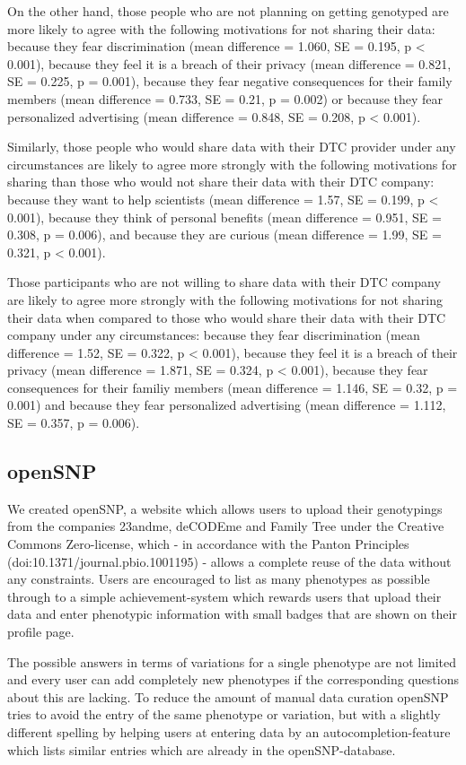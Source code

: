 \documentclass[10pt]{article}
\begin{document}
On the other hand, those people who are not planning on getting genotyped are more likely to agree with the following motivations for not sharing their data: because they fear discrimination (mean difference = 1.060, SE = 0.195, p < 0.001), because they feel it is a breach of their privacy (mean difference = 0.821, SE = 0.225, p = 0.001), because they fear negative consequences for their family members (mean difference = 0.733, SE = 0.21, p = 0.002) or because they fear personalized advertising (mean difference = 0.848, SE = 0.208, p < 0.001).

Similarly, those people who would share data with their DTC provider under any circumstances are likely to agree more strongly with the following motivations for sharing than those who would not share their data with their DTC company: because they want to help scientists (mean difference = 1.57, SE = 0.199, p < 0.001), because they think of personal benefits (mean difference = 0.951, SE = 0.308, p = 0.006), and because they are curious (mean difference = 1.99, SE = 0.321, p < 0.001). 

Those participants who are not willing to share data with their DTC company are likely to agree more strongly with the following motivations for not sharing their data when compared to those who would share their data with their DTC company under any circumstances: because they fear discrimination (mean difference = 1.52, SE = 0.322, p < 0.001), because they feel it is a breach of their privacy (mean difference = 1.871, SE = 0.324, p < 0.001), because they fear consequences for their familiy members (mean difference = 1.146, SE = 0.32, p = 0.001) and because they fear personalized advertising (mean difference =  1.112, SE = 0.357, p = 0.006). 

\subsection*{openSNP}
We created openSNP, a website which allows users to upload their genotypings from the companies 23andme, deCODEme and Family Tree under the Creative Commons Zero-license, which - in accordance with the Panton Principles (doi:10.1371/journal.pbio.1001195) - allows a complete reuse of the data without any constraints. Users are encouraged to list as many phenotypes as possible through to a simple achievement-system which rewards users that upload their data and enter phenotypic information with small badges that are shown on their profile page. 

The possible answers in terms of variations for a single phenotype are not limited and every user can add completely new phenotypes if the corresponding questions about this are lacking. To reduce the amount of manual data curation openSNP tries to avoid the entry of the same phenotype or variation, but with a slightly different spelling by helping users at entering data by an autocompletion-feature which lists similar entries which are already in the openSNP-database.
\end{document}
